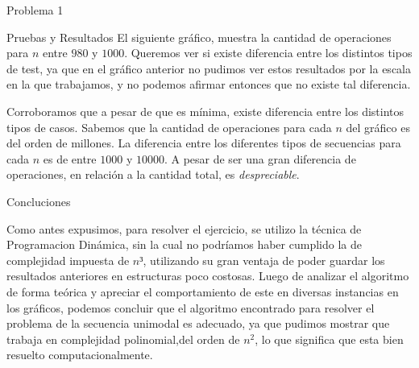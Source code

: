 \begin{section}{Problema 1}
\begin{subsection}{Pruebas y Resultados}
		El siguiente gráfico, muestra la cantidad de operaciones para $n$ entre $980$ y $1000$. Queremos ver si existe diferencia entre los distintos tipos de test, ya que en el gráfico anterior no pudimos ver estos resultados por la escala en la que trabajamos, y no podemos afirmar entonces que no existe tal diferencia.\\


		Corroboramos que a pesar de que es mínima, existe diferencia entre los distintos tipos de casos. Sabemos que la cantidad de operaciones para cada $n$ del gráfico es del orden de millones. La diferencia entre los diferentes tipos de secuencias para cada $n$ es de entre $1000$ y $10000$. A pesar de ser una gran diferencia de operaciones, en relación a la cantidad total, es {\em despreciable}.

	\end{subsection}

	\begin{subsection}{Concluciones}

			Como antes expusimos, para resolver el ejercicio, se utilizo la técnica de Programacion Dinámica, sin la cual no podríamos haber cumplido la 
		de complejidad impuesta de $n³$, utilizando su gran ventaja de poder guardar los resultados anteriores en estructuras poco costosas.
			Luego de analizar el algoritmo de forma teórica y apreciar el comportamiento de este en diversas instancias en los gráficos, podemos concluir
		 que el algoritmo encontrado para resolver el problema de la secuencia unimodal es adecuado, ya que pudimos mostrar que trabaja en complejidad
	 	polinomial,del orden de $n^2$, lo que significa que esta bien resuelto computacionalmente.
	\end{subsection}
\end{section}

